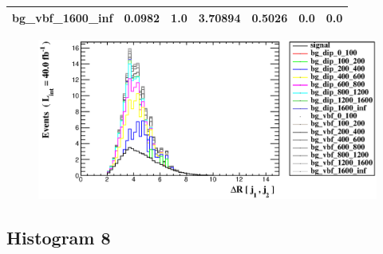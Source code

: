\documentclass[a4paper, 10pt]{article}
\begin{document}
\begin{table}[H]
\begin{center}
\begin{tabular}{|m{23.0mm}|m{23.0mm}|m{18.0mm}|m{19.0mm}|m{19.0mm}|m{19.0mm}|m{19.0mm}|}
      \hline
      {\cellcolor{white}         bg\_vbf\_1600\_inf}& {\cellcolor{white}         0.0982}& {\cellcolor{white}         1.0}& {\cellcolor{white}         3.70894}& {\cellcolor{white}         0.5026}& {\cellcolor{green}         0.0}& {\cellcolor{green}         0.0}\\
\hline
    \end{tabular}
  \end{center}
\end{table}

\begin{figure}[H]
  \begin{center}
    \includegraphics[scale=0.45]{selection_6.eps}\\
\caption{   }
  \end{center}
\end{figure}
      \newpage
\subsection{ Histogram 8}
\end{document}
